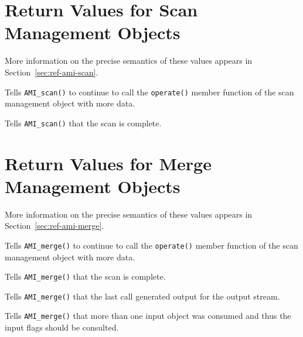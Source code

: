 \section{Return Values for Scan Management Objects}

More information on the precise semantics of these values appears in
Section~\ref{sec:ref-ami-scan}.
\begin{description}
\item[{\tt AMI\_SCAN\_CONTINUE}] Tells \verb|AMI_scan()| to continue
  to call the \verb|operate()| member function of the scan management
  object with more data.
\item[{\tt AMI\_SCAN\_DONE}] Tells \verb|AMI_scan()| that the scan is
  complete. 
\end{description}

\section{Return Values for Merge Management Objects}

More information on the precise semantics of these values appears in
Section~\ref{sec:ref-ami-merge}.
\begin{description}
\item[{\tt AMI\_MERGE\_CONTINUE}] Tells \verb|AMI_merge()| to continue
  to call the \verb|operate()| member function of the scan management
  object with more data.
\item[{\tt AMI\_MERGE\_DONE}] Tells \verb|AMI_merge()| that the scan is
  complete. 
\item[{\tt AMI\_MERGE\_OUTPUT}]  Tells \verb|AMI_merge()| that the
  last call generated output for the output stream.
\item[{\tt AMI\_MERGE\_READ\_MULTIPLE}]  Tells \verb|AMI_merge()| that
  more than one input object was consumed and thus the input flags
  should be consulted.
\end{description}


